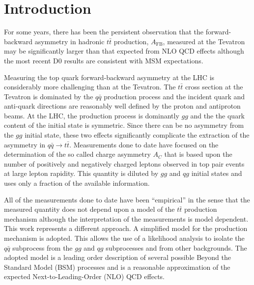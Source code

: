 \documentclass{cmspaperpdf}
\begin{document}
\clearpage

\tableofcontents

\setcounter{page}{2}%

\clearpage

\section{Introduction}

For some years, there has been the persistent observation that the forward-backward asymmetry in hadronic $t\bar t$ production, $A_\mathrm{FB}$, measured at the Tevatron \cite{cdf,d0} may be significantly larger than that expected from NLO QCD effects \cite{Kuhn:1998kw, Kuhn:2011ri, AguilarSaavedra:2012rx} although the most recent D0 results \cite{Abazov:2014cca} are consistent with MSM expectations.

Measuring the top quark forward-backward asymmetry at the LHC is considerably more challenging than at the Tevatron.  The $t\bar t$ cross section at the Tevatron is dominated by the $q\bar q$ production process and the incident quark and anti-quark directions are reasonably well defined by the proton and antiproton beams.  At the LHC, the production process is dominantly $gg$ and the the quark content of the initial state is symmetric.  Since there can be no asymmetry from the $gg$ initial state, these two effects significantly complicate the extraction of the asymmetry in $q\bar q\to t\bar t$.  Measurements \cite{ATLAS_measurement,CMS_measurement,Chatrchyan:2014yta} done to date have focused on the determination of the so called charge asymmetry $A_C$ that is based upon the number of positively and negatively charged leptons observed in top pair events at large lepton rapidity. This quantity is diluted by $gg$ and $qg$ initial states and uses only a fraction of the available information. 

All of the measurements done to date have been ``empirical'' in the sense that the measured quantity does not depend upon a model of the $t\bar t$ production mechanism although the interpretation of the measurements is model dependent.  This work represents a different approach.  A simplified model for the production mechanism is adopted.  This allows the use of a likelihood analysis to isolate the $q\bar q$ subprocess from the $gg$  and $qg$ subprocesses and from other backgrounds.  The adopted model is a leading order description of several possible Beyond the Standard Model (BSM) processes and is a reasonable approximation of the expected Next-to-Leading-Order (NLO) QCD effects.
\end{document}
